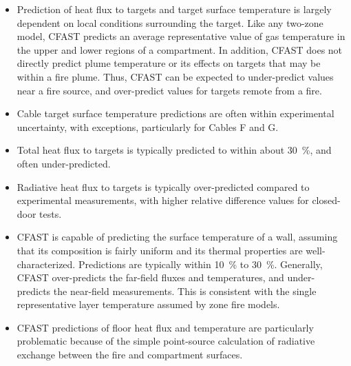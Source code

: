 \begin{itemize}
\item  Prediction of heat flux to targets and target surface temperature is largely dependent on local conditions surrounding the target.  Like any two-zone model, CFAST predicts an average representative value of gas temperature in the upper and lower regions of a compartment.  In addition, CFAST does not directly predict plume temperature or its effects on targets that may be within a fire plume.  Thus, CFAST can be expected to under-predict values near a fire source, and over-predict values for targets remote from a fire.
\item Cable target surface temperature predictions are often within experimental uncertainty, with exceptions, particularly for Cables F and G.
\item Total heat flux to targets is typically predicted to within about 30~\%, and often under-predicted.
\item Radiative heat flux to targets is typically over-predicted compared to experimental measurements, with higher relative difference values for closed-door tests.
\item CFAST is capable of predicting the surface temperature of a wall, assuming that its composition is fairly uniform and its thermal properties are well-characterized.  Predictions are typically within 10~\% to 30~\%.  Generally, CFAST over-predicts the far-field fluxes and temperatures, and under-predicts the near-field measurements.  This is consistent with the single representative layer temperature assumed by zone fire models.
\item CFAST predictions of floor heat flux and temperature are particularly problematic because of the simple point-source calculation of radiative exchange between the fire and compartment surfaces.
\end{itemize}

